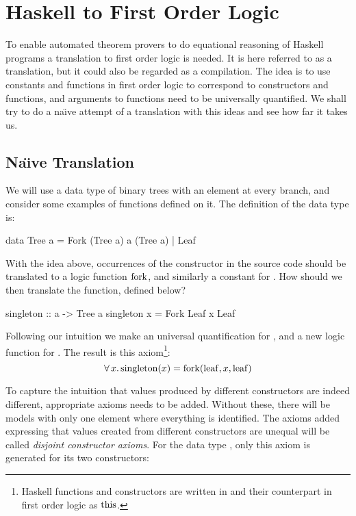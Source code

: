 \chapter{Haskell to First Order Logic}
\label{ch:translation}

To enable automated theorem provers to do equational reasoning of
Haskell programs a translation to first order logic is needed. It is
here referred to as a translation, but it could also be regarded as a
compilation. The idea is to use constants and functions in first order
logic to correspond to constructors and functions, and arguments to
functions need to be universally quantified. We shall try to do a
na\"{\i}ve attempt of a translation with this ideas and see how far it
takes us.

\section{Na\"{\i}ve Translation}
\label{sec:treetrans}

We will use a data type of binary trees with an element at every
branch, and consider some examples of functions defined on it. The
definition of the data type is:

\begin{code}
data Tree a = Fork (Tree a) a (Tree a) | Leaf
\end{code}

\noindent
With the idea above, occurrences of the  constructor in the
source code should be translated to a logic function $\mathrm{fork}$, and
similarly a constant for . How should we then translate the
 function, defined below?

\begin{code}
singleton :: a -> Tree a
singleton x = Fork Leaf x Leaf
\end{code}

\noindent
Following our intuition we make an universal quantification for
, and a new logic function for . The result
is this axiom\footnote{Haskell functions and constructors are written in
 and their counterpart in first order logic as $\mathrm{this}$.}:
\begin{equation*}
\forall \, x . \, \mathrm{singleton}(x) = \mathrm{fork}(\mathrm{leaf},x,\mathrm{leaf})
\end{equation*}

\noindent
To capture the intuition that values produced by different
constructors are indeed different, appropriate axioms needs to be
added. Without these, there will be models with only one element where
everything is identified. The axioms added expressing that values
created from different constructors are unequal will be called
\emph{disjoint constructor axioms}. For the data type , only
this axiom is generated for its two constructors:

